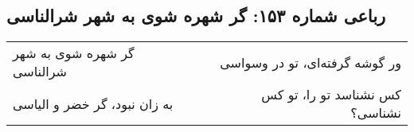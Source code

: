 \begin{center}
\section*{رباعی شماره ۱۵۳: گر شهره شوی به شهر شرالناسی}
\label{sec:153}
\begin{longtable}{l p{0.5cm} r}
گر شهره شوی به شهر شرالناسی
&&
ور گوشه گرفته‌ای، تو در وسواسی
\\
به زان نبود، گر خضر و الیاسی
&&
کس نشناسد تو را، تو کس نشناسی؟
\\
\end{longtable}
\end{center}
